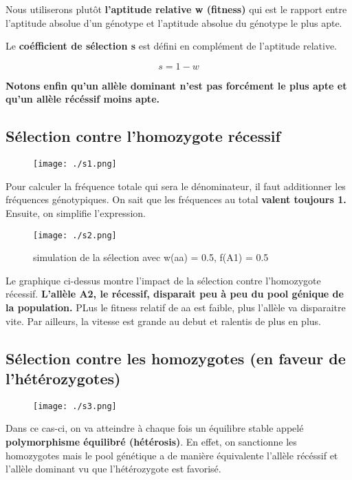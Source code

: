 \documentclass{article}
\begin{document}
Nous utiliserons plutôt \textbf{l'aptitude relative w (fitness)} qui est le rapport entre l'aptitude absolue d'un génotype et l'aptitude absolue du génotype le plus apte.

Le \textbf{coéfficient de sélection s} est défini en complément de l'aptitude relative.

\begin{equation}
s = 1 - w
\end{equation}

\textbf{Notons enfin qu'un allèle dominant n'est pas forcément le plus apte et qu'un allèle récéssif moins apte.}
\subsection{Sélection contre l'homozygote récessif}

\begin{figure}[H]
\texttt{[image: ./s1.png]}
\end{figure}
\pagebreak
Pour calculer la fréquence totale qui sera le dénominateur, il faut additionner les fréquences génotypiques. On sait que les fréquences au total \textbf{valent toujours 1.} Ensuite, on simplifie l'expression.

\begin{figure}[H]
\texttt{[image: ./s2.png]}
\caption{simulation de la sélection avec w(aa) = 0.5, f(A1) = 0.5}
\end{figure}
Le graphique ci-dessus montre l'impact de la sélection contre l'homozygote récessif. \textbf{L'allèle A2, le récessif, disparait peu à peu du pool génique de la population.} PLus le fitness relatif de aa est faible, plus l'allèle va disparaitre vite. Par ailleurs, la vitesse est grande au debut et ralentis de plus en plus. 


\subsection{Sélection contre les homozygotes (en faveur de l'hétérozygotes)}
\begin{figure}[H]
\texttt{[image: ./s3.png]}
\end{figure}

Dans ce cas-ci, on va atteindre à chaque fois un équilibre stable appelé \textbf{polymorphisme équilibré (hétérosis)}. En effet, on sanctionne les homozygotes mais le pool génétique a de manière équivalente l'allèle récéssif et l'allèle dominant vu que l'hétérozygote est favorisé.
\end{document}
